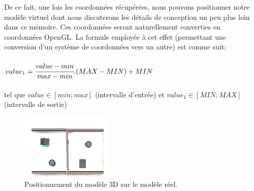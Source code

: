 \documentclass[a4paper, 12pt]{book}
\begin{document}
 De ce fait, une fois les coordonnées récupérées, nous pouvons positionner notre modèle virtuel dont nous discuterons les détails de conception un peu plus loin dans ce mémoire. Ces coordonnées seront naturellement converties en coordonnées OpenGL. La formule employée à cet effet (permettant une conversion d'un système de coordonnées vers un autre) est comme suit:\\ \\
$ value_{1} = \cfrac{value - min}{max - min}.(MAX - MIN) + MIN$ \\ \\ tel que $  value\in \left[min;max\right] $ (intervalle d'entrée) et $ value_{1}\in \left[MIN;MAX\right] $ (intervalle de sortie)  \\

\begin{figure}[htbp]
  \hspace{5cm}
 \includegraphics[scale=1]{images/modelDetected.png} \hspace{2cm}
  \caption{Positionnement du modèle 3D sur le modèle réel.\label{fig-modelDetected}}
\end{figure}
\end{document}
